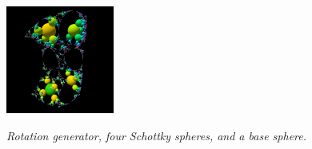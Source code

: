 \begin{figure}[h!tbp]
\begin{minipage}[t]{0.5\hsize}
\begin{minipage}{0.25\hsize}
   \label{fig:rotationGen}
  \end{minipage}
  \hspace*{\fill}
  \begin{minipage}{0.25\hsize}
   \center
   \includegraphics[width=1.4in, height=1.4in, keepaspectratio]{./img/application/3dGen/rotationOrb.pdf}
   \label{fig:rotationOrb}
  \end{minipage}
  \hspace*{\fill}
  \caption{\textit{Rotation generator, four Schottky spheres, and a base
  sphere.}}
  \label{fig:rotation3d}
 \end{minipage}
\end{figure}

